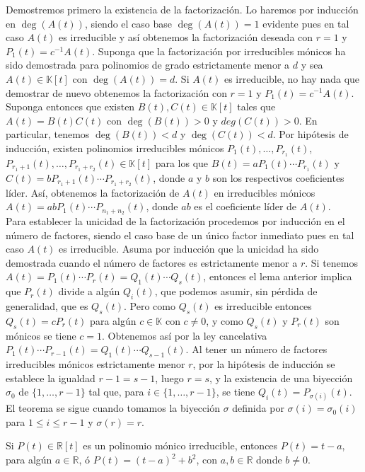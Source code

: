 \dem Demostremos primero la existencia de la factorización. Lo haremos por inducción en $\deg(A(t))$, siendo el caso base $\deg(A(t))=1$ evidente pues en tal caso $A(t)$ es irreducible y así obtenemos la factorización deseada con $r=1$ y $P_1(t)=c^{-1}A(t)$. Suponga que la factorización por irreducibles mónicos ha sido demostrada para polinomios de grado estrictamente menor a $d$ y sea $A(t)\in \mathbb{K}[t]$ con $\deg(A(t))=d$. Si $A(t)$ es irreducible, no hay nada que demostrar de nuevo obtenemos la factorización con $r=1$ y $P_1(t)=c^{-1}A(t)$. Suponga entonces que existen $B(t),C(t)\in \mathbb{K}[t]$ tales que $A(t)=B(t)C(t)$ con $\deg(B(t))>0$ y $deg(C(t))>0$. En particular, tenemos $\deg(B(t))<d$ y $\deg(C(t))<d$. Por hipótesis de inducción, existen polinomios irreducibles mónicos $P_1(t),\ldots,P_{r_1}(t)$, $P_{r_1+1}(t),\ldots,P_{r_1+r_2}(t)\in \mathbb{K}[t]$ para los que $B(t)=aP_1(t)\cdots P_{r_1}(t)$ y $C(t)=bP_{r_1+1}(t)\cdots P_{r_1+r_2}(t)$, donde $a$ y $b$ son los respectivos coeficientes líder. Así, obtenemos la factorización de $A(t)$ en irreducibles mónicos $A(t)=abP_1(t)\cdots P_{n_1+n_2}(t)$, donde $ab$ es el coeficiente líder de $A(t)$.\\
Para establecer la unicidad de la factorización procedemos por inducción en el número de factores, siendo el caso base de un único factor inmediato pues en tal caso $A(t)$ es irreducible. Asuma por inducción que la unicidad ha sido demostrada cuando el número de factores es estrictamente menor a $r$. Si tenemos $A(t)=P_1(t)\cdots P_r(t)=Q_1(t)\cdots Q_s(t)$, entonces el lema anterior implica que $P_r(t)$ divide a algún $Q_i(t)$, que podemos asumir, sin pérdida de generalidad, que es $Q_s(t)$. Pero como $Q_s(t)$ es irreducible entonces $Q_s(t)=cP_r(t)$ para algún $c\in \mathbb{K}$ con $c\ne 0$, y como $Q_s(t)$ y $P_r(t)$ son mónicos se tiene $c=1$. Obtenemos así por la ley cancelativa $P_1(t)\cdots P_{r-1}(t)=Q_1(t)\cdots Q_{s-1}(t)$. Al tener un número de factores irreducibles mónicos estrictamente menor $r$, por la hipótesis de inducción se establece la igualdad $r-1=s-1$, luego $r=s$, y la existencia de una biyección $\sigma_0$ de $\{1,\ldots,r-1\}$ tal que, para $i\in\{1,\ldots,r-1\}$, se tiene $Q_i(t)=P_{\sigma(i)}(t)$. El teorema se sigue cuando tomamos la biyección $\sigma$ definida por $\sigma(i)=\sigma_0(i)$ para $1\le i\le r-1$ y $\sigma(r)=r$.

\begin{teo}
Si $P(t)\in\mathbb{R}[t]$ es un polinomio mónico irreducible, entonces $P(t)=t-a$, para algún $a\in\mathbb{R}$, ó $P(t)=(t-a)^2+b^2$, con $a,b\in\mathbb{R}$ donde $b\ne 0$. 
\end{teo}

